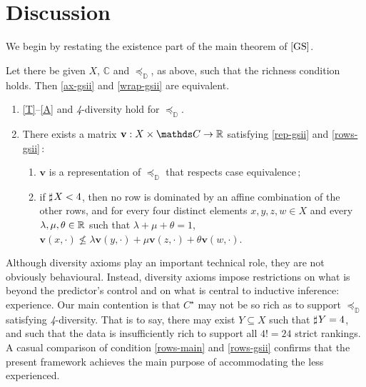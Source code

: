 \documentclass[12pt,a4paper,twoside]{article}
\newcommand{\gsii}{$\textup{[GS]}$}
\newcommand{\preceqb}{\mathbin{\preceq}}
\newcommand{\countof}{\mathbin{\sharp}\hskip1pt}
\newcommand{\mbbd}{{\mathds D}}
\newcommand{\mbbc}{{\mathds C}}
\newcommand{\current}{{C^\star}}
\newcommand{\fourdiv}{\textit{4}-\textup{diversity}}
\begin{document}
\section{Discussion}\label{sec-discussion}
We begin by restating the existence part of the main theorem of \gsii.
\begin{theorem*}[Existence]\label{thm-gsii}
  Let there be given  $X$, $ \mbbc $ and $\preceqb_ \mbbd$, as above, such that the
  richness condition holds. Then \ref{ax-gsii} and \ref{wrap-gsii} are equivalent.

\begin{enumerate}[label=\textup{(\roman*)}]

\item\label{ax-gsii}

  \textup{\ref{T}--\ref{A}} and \textup{\fourdiv} hold for $\preceq_{\mbbd}$.

\item\label{wrap-gsii} There exists a matrix
  $ \mathbf{v} : X \times \mbbc \rightarrow \R $ satisfying \ref{rep-gsii} and \ref{rows-gsii}$\,:$
  \begin{enumerate}[label=\textup{(\alph*)}]
  \item\label{rep-gsii}
  $ \mathbf{v} $ is a representation of $ \preceq _ { \mbbd }$ that respects case equivalence$\,;$

\item\label{rows-gsii} if $\countof X < 4$, then no row is dominated by an
  affine combination of the other rows, and for every four distinct elements
  $x,y,z,w \in X$ and every $\lambda , \mu, \theta \in \mathbb R$ such that
  $ \lambda +\mu + \theta = 1$,
  $\mathbf{v}(x,\cdot ) \not \leq \lambda \mathbf{v}(y,\cdot )+\mu
  \mathbf{v}(z,\cdot)+ \theta \mathbf{v}(w,\cdot)$.
\end{enumerate}  

\end{enumerate}
\end{theorem*}

Although diversity axioms play an important technical role, they are not
obviously behavioural. Instead, diversity axioms impose restrictions on what is
beyond the predictor's control and on what is central to inductive inference:
experience. Our main contention is that $ \current $ may not be so rich as to
support $\preceqb_{\mbbd}$ satisfying \fourdiv. That is to say, there may exist
$ Y \subseteq X $ such that $ \countof Y = 4$, and such that the data is
insufficiently rich to support all $ 4 ! = 24 $ strict rankings. A casual
comparison of condition \ref{rows-main} and \ref{rows-gsii} confirms that the
present framework achieves the main purpose of accommodating the less
experienced.
\end{document}
